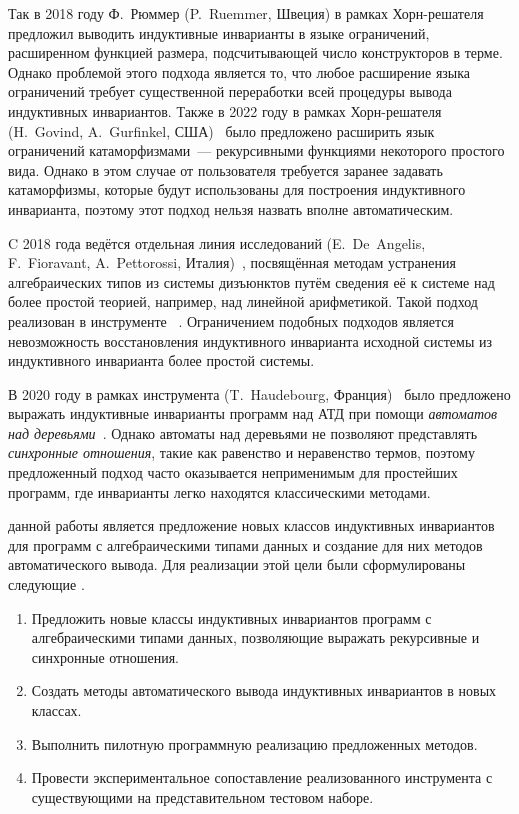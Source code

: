 Так в 2018 году Ф.~Рюммер (P.~Ruemmer, Швеция) в рамках Хорн-решателя \eldarica{}~\cite{8603013} предложил выводить индуктивные инварианты в языке ограничений, расширенном функцией размера, подсчитывающей число конструкторов в терме. Однако проблемой этого подхода является то, что любое расширение языка ограничений требует существенной переработки всей процедуры вывода индуктивных инвариантов.
Также в 2022 году в рамках Хорн-решателя \racer{} (H.~Govind, A.~Gurfinkel, США)~\cite{10.1145/3498722} было предложено расширить язык ограничений катаморфизмами~--- рекурсивными функциями некоторого простого вида. Однако в этом случае от пользователя требуется заранее задавать катаморфизмы, которые будут использованы для построения индуктивного инварианта, поэтому этот подход нельзя назвать вполне автоматическим.

C 2018 года ведётся отдельная линия исследований (E.~De~Angelis, F.~Fioravant, A.~Pettorossi, Италия)~\cite{10.1093/logcom/exab090,pettorossi_proietti_2022,10.1007/978-3-030-51074-9_6,angelis_fioravanti_pettorossi_proietti_2018}, посвящённая методам устранения алгебраических типов из системы дизъюнктов путём сведения её к системе над более простой теорией, например, над линейной арифметикой. Такой подход реализован в инструменте \vericat{}~\cite{de_angelis_proietti_fioravanti_pettorossi_2022}. Ограничением подобных подходов является невозможность восстановления индуктивного инварианта исходной системы из индуктивного инварианта более простой системы.

В 2020 году в рамках инструмента \rchc{} (T.~Haudebourg, Франция)~\cite{haude2020} было предложено выражать индуктивные инварианты программ над АТД при помощи \emph{автоматов над деревьями}~\cite{tata}.
Однако автоматы над деревьями не позволяют представлять \emph{синхронные отношения}, такие как равенство и неравенство термов, поэтому предложенный подход часто оказывается неприменимым для простейших программ, где инварианты легко находятся классическими методами.

{\aim} данной работы является предложение новых классов индуктивных инвариантов для программ с алгебраическими типами данных и создание для них методов автоматического вывода.
Для реализации этой цели были сформулированы следующие {\tasks}.
\begin{enumerate}[beginpenalty=10000] %
  \item Предложить новые классы индуктивных инвариантов программ с алгебраическими типами данных, позволяющие выражать рекурсивные и синхронные отношения.
  \item Создать методы автоматического вывода индуктивных инвариантов в новых классах.
  \item Выполнить пилотную программную реализацию предложенных методов.
  \item Провести экспериментальное сопоставление реализованного инструмента с существующими на представительном тестовом наборе.
\end{enumerate}

